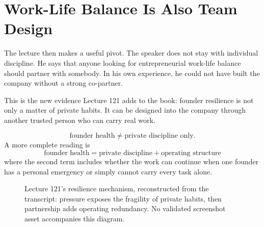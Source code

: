 \documentclass[11pt,oneside]{book}
\begin{document}
\section{Work-Life Balance Is Also Team Design}

The lecture then makes a useful pivot. The speaker does not stay with individual discipline. He says that anyone looking for entrepreneurial work-life balance should partner with somebody. In his own experience, he could not have built the company without a strong co-partner.

This is the new evidence Lecture 121 adds to the book: founder resilience is not only a matter of private habits. It can be designed into the company through another trusted person who can carry real work.

\[
\text{founder health}
\neq
\text{private discipline only}.
\]
A more complete reading is
\[
\text{founder health}
=
\text{private discipline}
+
\text{operating structure}
\]
where the second term includes whether the work can continue when one founder has a personal emergency or simply cannot carry every task alone.

\begin{figure}
\centering
{}
\caption{Lecture 121's resilience mechanism, reconstructed from the transcript: pressure exposes the fragility of private habits, then partnership adds operating redundancy. No validated screenshot asset accompanies this diagram.}
\end{figure}
\end{document}
